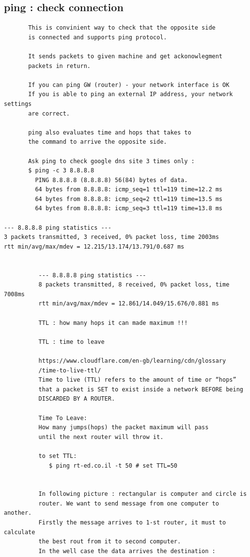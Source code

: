 \documentclass[a4paper,12pt]{article}
\begin{document}
\subsection{ping : check connection}
\begin{verbatim}
       This is convinient way to check that the opposite side
       is connected and supports ping protocol.
       
       It sends packets to given machine and get ackonowlegment 
       packets in return.
       
       If you can ping GW (router) - your network interface is OK
       If you is able to ping an external IP address, your network settings 
       are correct.
       
       ping also evaluates time and hops that takes to 
       the command to arrive the opposite side.
       
       Ask ping to check google dns site 3 times only : 
       $ ping -c 3 8.8.8.8
         PING 8.8.8.8 (8.8.8.8) 56(84) bytes of data.
         64 bytes from 8.8.8.8: icmp_seq=1 ttl=119 time=12.2 ms
         64 bytes from 8.8.8.8: icmp_seq=2 ttl=119 time=13.5 ms
         64 bytes from 8.8.8.8: icmp_seq=3 ttl=119 time=13.8 ms

--- 8.8.8.8 ping statistics ---
3 packets transmitted, 3 received, 0% packet loss, time 2003ms
rtt min/avg/max/mdev = 12.215/13.174/13.791/0.687 ms


          --- 8.8.8.8 ping statistics ---
          8 packets transmitted, 8 received, 0% packet loss, time 7008ms
          rtt min/avg/max/mdev = 12.861/14.049/15.676/0.881 ms

          TTL : how many hops it can made maximum !!!
          
          TTL : time to leave
          
          https://www.cloudflare.com/en-gb/learning/cdn/glossary
          /time-to-live-ttl/  
          Time to live (TTL) refers to the amount of time or “hops” 
          that a packet is SET to exist inside a network BEFORE being
          DISCARDED BY A ROUTER.
          
          Time To Leave:
          How many jumps(hops) the packet maximum will pass 
          until the next router will throw it.
       
          to set TTL:
             $ ping rt-ed.co.il -t 50 # set TTL=50  
           
          
          In following picture : rectangular is computer and circle is 
          router. We want to send message from one computer to another. 
          Firstly the message arrives to 1-st router, it must to calculate   
          the best rout from it to second computer. 
          In the well case the data arrives the destination :
          

\end{verbatim}
\end{document}
